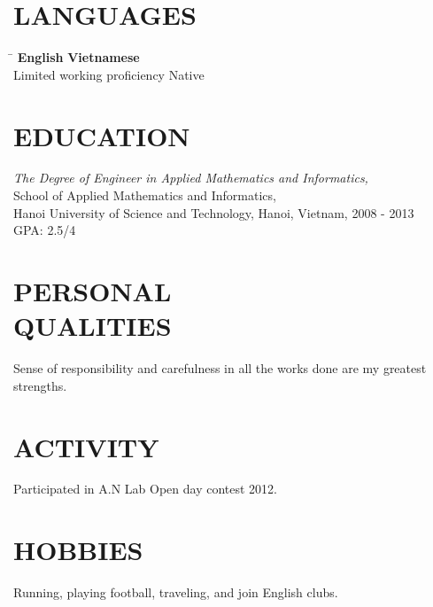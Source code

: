 \documentclass[margin, 10pt]{res}
\begin{document}
\begin{resume}
\section{LANGUAGES}
	\vspace{-0.1in}
	\begin{tabbing}
    \hspace{2.8in}\= \kill %
    \textbf{English}            \> \textbf{Vietnamese}\\
    Limited working proficiency \> Native\\
	\end{tabbing}\vspace{-20pt}
	
\section{EDUCATION}
   {\sl The Degree of Engineer in Applied Mathematics and Informatics,}\\
   School of Applied Mathematics and Informatics, \\
   Hanoi University of Science and Technology, Hanoi, Vietnam, 2008 - 2013 \\
   GPA: 2.5/4\\
	
\section{PERSONAL \\ QUALITIES} Sense of responsibility and carefulness in all the works done are my greatest strengths.\\
 
\section{ACTIVITY} Participated in A.N Lab Open day contest 2012.

\section{HOBBIES} Running, playing football, traveling, and join English clubs.

\end{resume}
\end{document}
